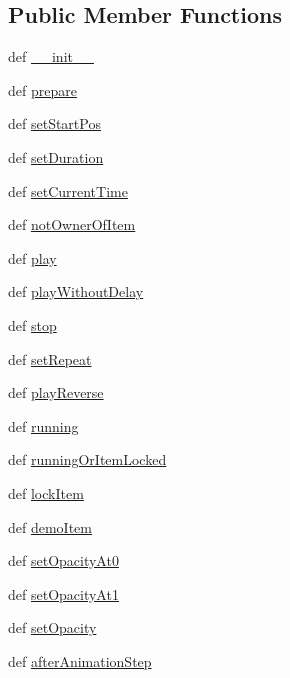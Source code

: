 \subsection*{Public Member Functions}
\begin{DoxyCompactItemize}
\item 
def \hyperlink{classdemoitemanimation_1_1DemoItemAnimation_a78e46edac41529209098f353ca46e140}{\+\_\+\+\_\+init\+\_\+\+\_\+}
\item 
def \hyperlink{classdemoitemanimation_1_1DemoItemAnimation_a292147fdb7fb8aca70b94987cfaa3c87}{prepare}
\item 
def \hyperlink{classdemoitemanimation_1_1DemoItemAnimation_a0308ed61b2896979e500d0146ee08730}{set\+Start\+Pos}
\item 
def \hyperlink{classdemoitemanimation_1_1DemoItemAnimation_a83b14898f02700e3499fdd209ae99c7d}{set\+Duration}
\item 
def \hyperlink{classdemoitemanimation_1_1DemoItemAnimation_a5eb368f9a17db50731bdb2c6a652507b}{set\+Current\+Time}
\item 
def \hyperlink{classdemoitemanimation_1_1DemoItemAnimation_a21d353702b82f5a7fbdf65e5ce5f41e7}{not\+Owner\+Of\+Item}
\item 
def \hyperlink{classdemoitemanimation_1_1DemoItemAnimation_aa86511ee56bd3ffc8601e04e3c0dfae3}{play}
\item 
def \hyperlink{classdemoitemanimation_1_1DemoItemAnimation_a07fdb794705508175acf8c07aac60934}{play\+Without\+Delay}
\item 
def \hyperlink{classdemoitemanimation_1_1DemoItemAnimation_ac1b9095f9b00c072d40cb30a30fc8a38}{stop}
\item 
def \hyperlink{classdemoitemanimation_1_1DemoItemAnimation_a9d1780a62cba2e76ebc985350d5cce16}{set\+Repeat}
\item 
def \hyperlink{classdemoitemanimation_1_1DemoItemAnimation_ae6a376b1617076adae87614a1f0e290c}{play\+Reverse}
\item 
def \hyperlink{classdemoitemanimation_1_1DemoItemAnimation_a6d78f23f55194773351a80d38c37bfba}{running}
\item 
def \hyperlink{classdemoitemanimation_1_1DemoItemAnimation_a096e15080ca96d3fc85a3b1f369609ea}{running\+Or\+Item\+Locked}
\item 
def \hyperlink{classdemoitemanimation_1_1DemoItemAnimation_a3b50c212dde6b80c56487f339b226d50}{lock\+Item}
\item 
def \hyperlink{classdemoitemanimation_1_1DemoItemAnimation_a4209558740228fa99a0a19ccf03428aa}{demo\+Item}
\item 
def \hyperlink{classdemoitemanimation_1_1DemoItemAnimation_ae342bd985d688129aa1fc29ba30ee851}{set\+Opacity\+At0}
\item 
def \hyperlink{classdemoitemanimation_1_1DemoItemAnimation_ae36499897c29a56f458e91279a1024c7}{set\+Opacity\+At1}
\item 
def \hyperlink{classdemoitemanimation_1_1DemoItemAnimation_a08ad163442cd6897ef1ebb2db0867c9c}{set\+Opacity}
\item 
def \hyperlink{classdemoitemanimation_1_1DemoItemAnimation_aa8ead083079ac8226c8b8239034ba88b}{after\+Animation\+Step}
\end{DoxyCompactItemize}
